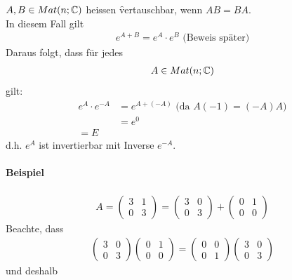 $A, B \in Mat(n; \mathbb{C})$ heissen \f{vertauschbar}, wenn $AB = BA$. \\
In diesem Fall gilt
\begin{align}
e^{A+B} = e^{A} \cdot e^{B} \text{ (Beweis später)}
\end{align}
Daraus folgt, dass für jedes
\begin{align}
A\in Mat(n; \mathbb{C})
\end{align}
gilt:
\begin{align}
e^A \cdot e^{-A} &= e^{A + (-A)} \text{ (da } A(-1) = (-A)A )\\
&= e^0 \\
 = E
\end{align}
d.h. $e^A$ ist invertierbar mit Inverse $e^{-A}$.

\paragraph{Beispiel}
\begin{align}
A = \begin{pmatrix} 3 & 1 \\ 0 & 3\end{pmatrix} = \begin{pmatrix} 3 & 0 \\ 0 & 3\end{pmatrix} + \begin{pmatrix} 0 & 1 \\ 0 & 0 \end{pmatrix}
\end{align}
Beachte, dass 
\begin{align}
\begin{pmatrix} 3 & 0 \\ 0 & 3\end{pmatrix}\begin{pmatrix} 0 & 1 \\ 0 & 0\end{pmatrix} = \begin{pmatrix} 0 & 0 \\ 0 & 1\end{pmatrix}\begin{pmatrix} 3 & 0 \\ 0 & 3 \end{pmatrix}
\end{align}
und deshalb
